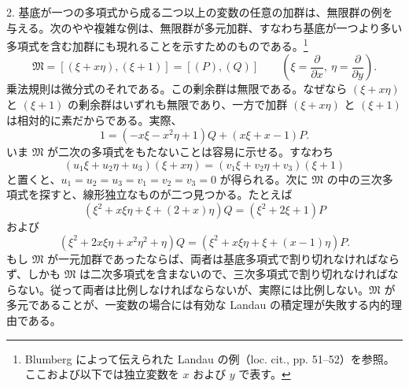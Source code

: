 2. 基底が一つの多項式から成る二つ以上の変数の任意の加群は、無限群の例を与える。次のやや複雑な例は、無限群が多元加群、すなわち基底が一つより多い多項式を含む加群にも現れることを示すためのものである。\footnote{Blumberg によって伝えられた Landau の例（loc. cit., pp. 51--52）を参照。ここおよび以下では独立変数を $x$ および $y$ で表す。}
\[
 \mathfrak M=[(\xi+x\eta),(\xi+1)]=[(P),(Q)]
 \qquad\left(\xi=\frac{\partial}{\partial x},\ \eta=\frac{\partial}{\partial y}\right).
\]
乗法規則は微分式のそれである。この剰余群は無限である。なぜなら $(\xi+x\eta)$ と $(\xi+1)$ の剰余群はいずれも無限であり、一方で加群 $(\xi+x\eta)$ と $(\xi+1)$ は相対的に素だからである。実際、
\[
 1=(-x\xi-x^2\eta+1)Q+(x\xi+x-1)P.
\]
いま $\mathfrak M$ が二次の多項式をもたないことは容易に示せる。すなわち
\[
 (u_1\xi+u_2\eta+u_3)(\xi+x\eta)=(v_1\xi+v_2\eta+v_3)(\xi+1)
\]
と置くと、$u_1=u_2=u_3=v_1=v_2=v_3=0$ が得られる。次に $\mathfrak M$ の中の三次多項式を探すと、線形独立なものが二つ見つかる。たとえば
\[
 (\xi^2+x\xi\eta+\xi+(2+x)\eta)Q=(\xi^2+2\xi+1)P
\]
および
\[
 (\xi^2+2x\xi\eta+x^2\eta^2+\eta)Q
 =(\xi^2+x\xi\eta+\xi+(x-1)\eta)P.
\]
もし $\mathfrak M$ が一元加群であったならば、両者は基底多項式で割り切れなければならず、しかも $\mathfrak M$ は二次多項式を含まないので、三次多項式で割り切れなければならない。従って両者は比例しなければならないが、実際には比例しない。$\mathfrak M$ が多元であることが、一変数の場合には有効な Landau の積定理が失敗する内的理由である。

